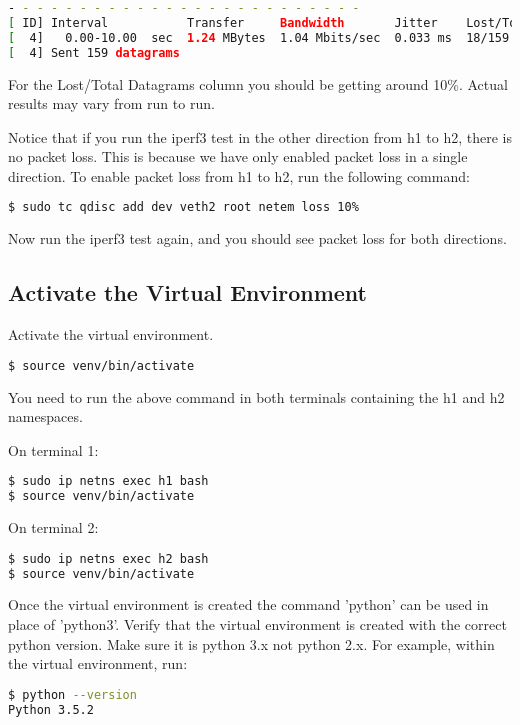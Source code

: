 \documentclass[11pt]{article}
\begin{document}
\begin{minipage}{\linewidth}
\begin{lstlisting}[caption={Output of 'iperf3'}, language=bash]
- - - - - - - - - - - - - - - - - - - - - - - - -
[ ID] Interval           Transfer     Bandwidth       Jitter    Lost/Total Datagrams
[  4]   0.00-10.00  sec  1.24 MBytes  1.04 Mbits/sec  0.033 ms  18/159 (11%)  
[  4] Sent 159 datagrams
\end{lstlisting}
\end{minipage}

\noindent For the Lost/Total Datagrams column you should be getting around 10\%. Actual results may vary from run to run.

\noindent Notice that if you run the iperf3 test in the other direction from h1 to h2, there is no packet loss. This is because we have only enabled packet loss in a single direction. To enable packet loss from h1 to h2, run the following command:
\begin{lstlisting}[language=bash]
$ sudo tc qdisc add dev veth2 root netem loss 10%
\end{lstlisting}

Now run the iperf3 test again, and you should see packet loss for both directions.
\subsection{Activate the Virtual Environment}
Activate the virtual environment.
\begin{lstlisting}[language=bash]
$ source venv/bin/activate
\end{lstlisting}
You need to run the above command in both terminals containing the h1 and h2 namespaces.

On terminal 1:
\begin{lstlisting}[language=bash]
$ sudo ip netns exec h1 bash
$ source venv/bin/activate
\end{lstlisting}
On terminal 2:
\begin{lstlisting}[language=bash]
$ sudo ip netns exec h2 bash
$ source venv/bin/activate
\end{lstlisting}
Once the virtual environment is created the command 'python' can be used in place of 'python3'. Verify that the virtual environment is created with the correct python version. Make sure it is python 3.x not python 2.x. For example, within the virtual environment, run:
\begin{lstlisting}[language=bash]
$ python --version
Python 3.5.2
\end{lstlisting}
\end{document}
